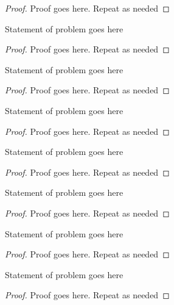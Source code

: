 \documentclass[12pt]{article}
\newenvironment{problem}[2][Problem]{\begin{trivlist}
\item[\hskip \labelsep {\bfseries #1}\hskip \labelsep {\bfseries #2.}]}{\end{trivlist}}
\begin{document}
\begin{proof}
Proof goes here. Repeat as needed
\end{proof}


\begin{problem}{x.yz}
Statement of problem goes here
\end{problem}

\begin{proof}
Proof goes here. Repeat as needed
\end{proof}

\begin{problem}{x.yz}
Statement of problem goes here
\end{problem}

\begin{proof}
Proof goes here. Repeat as needed
\end{proof}


\begin{problem}{x.yz}
Statement of problem goes here
\end{problem}

\begin{proof}
Proof goes here. Repeat as needed
\end{proof}


\begin{problem}{x.yz}
Statement of problem goes here
\end{problem}

\begin{proof}
Proof goes here. Repeat as needed
\end{proof}


\begin{problem}{x.yz}
Statement of problem goes here
\end{problem}

\begin{proof}
Proof goes here. Repeat as needed
\end{proof}


\begin{problem}{x.yz}
Statement of problem goes here
\end{problem}

\begin{proof}
Proof goes here. Repeat as needed
\end{proof}


\begin{problem}{x.yz}
Statement of problem goes here
\end{problem}

\begin{proof}
Proof goes here. Repeat as needed
\end{proof}
\end{document}
